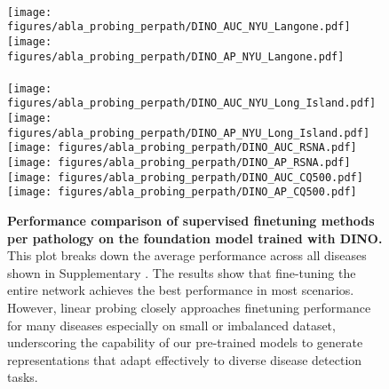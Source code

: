 
\begin{figure}
    \centering
     \\[0.2cm]
    \texttt{[image: figures/abla\_probing\_perpath/DINO\_AUC\_NYU\_Langone.pdf]}
    \texttt{[image: figures/abla\_probing\_perpath/DINO\_AP\_NYU\_Langone.pdf]} \\
     \\[0.2cm]
    \texttt{[image: figures/abla\_probing\_perpath/DINO\_AUC\_NYU\_Long\_Island.pdf]}
    \texttt{[image: figures/abla\_probing\_perpath/DINO\_AP\_NYU\_Long\_Island.pdf]} 
     \\[0.2cm]
    \texttt{[image: figures/abla\_probing\_perpath/DINO\_AUC\_RSNA.pdf]}
    \hspace{5mm}
    \texttt{[image: figures/abla\_probing\_perpath/DINO\_AP\_RSNA.pdf]} 
     \\[0.2cm]
    \texttt{[image: figures/abla\_probing\_perpath/DINO\_AUC\_CQ500.pdf]} \hspace{5mm}
    \texttt{[image: figures/abla\_probing\_perpath/DINO\_AP\_CQ500.pdf]} 
    \caption{\textbf{Performance comparison of supervised finetuning methods per pathology on the foundation model trained with DINO.} This plot breaks down the average performance across all diseases shown in Supplementary . The results show that fine-tuning the entire network achieves the best performance in most scenarios. However, linear probing closely approaches finetuning performance for many diseases especially on small or imbalanced dataset, underscoring the capability of our pre-trained models to generate representations that adapt effectively to diverse disease detection tasks.}
    \label{fig:probing-comparison-perpath-dino}
\end{figure}

